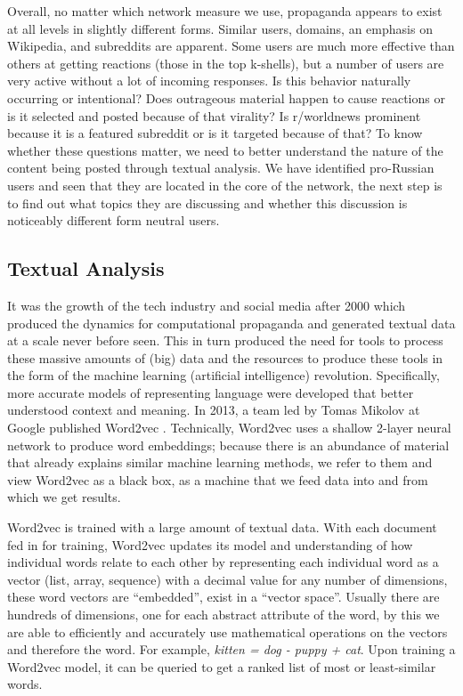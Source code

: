 Overall, no matter which network measure we use, propaganda appears to exist at all levels in slightly different forms.
Similar users, domains, an emphasis on Wikipedia, and subreddits are apparent. Some users are much more effective than others at getting reactions (those in the top k-shells), but a number of users are very active without a lot of incoming responses.
Is this behavior naturally occurring or intentional?
Does outrageous material happen to cause reactions or is it selected and posted because of that virality?
Is r/worldnews prominent because it is a featured subreddit or is it targeted because of that?
To know whether these questions matter, we need to better understand the nature of the content being posted through textual analysis.
We have identified pro-Russian users and seen that they are located in the core of the network, the next step is to find out what topics they are discussing and whether this discussion is noticeably different form neutral users.

\subsection{Textual Analysis}

It was the growth of the tech industry and social media after 2000 which produced the dynamics for computational propaganda and generated textual data at a scale never before seen.
This in turn produced the need for tools to process these massive amounts of (big) data and the resources to produce these tools in the form of the machine learning (artificial intelligence) revolution.
Specifically, more accurate models of representing language were developed that better understood context and meaning.
In 2013, a team led by Tomas Mikolov at Google published Word2vec \cite{mikolov2013}.
Technically, Word2vec uses a shallow 2-layer neural network to produce word embeddings; because there is an abundance of material that already explains similar machine learning methods, we refer to them and view Word2vec as a black box, as a machine that we feed data into and from which we get results.

Word2vec is trained with a large amount of textual data.
With each document fed in for training, Word2vec updates its model and understanding of how individual words relate to each other by representing each individual word as a vector (list, array, sequence) with a decimal value for any number of dimensions, these word vectors are ``embedded'', exist in a ``vector space''.
Usually there are hundreds of dimensions, one for each abstract attribute of the word, by this we are able to efficiently and accurately use mathematical operations on the vectors and therefore the word.
For example, \emph{kitten = dog - puppy + cat}.
Upon training a Word2vec model, it can be queried to get a ranked list of most or least-similar words.

